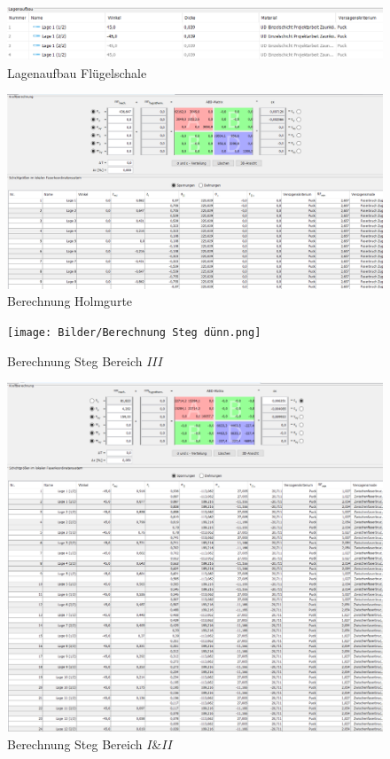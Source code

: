 \begin{figure}[h]
	\includegraphics[width=1.0\textwidth]{Bilder/Lagenaufbau Haut.png}
	\caption{Lagenaufbau Flügelschale}
	\label{fig:Lagenaufbau Haut}
\end{figure}
\begin{figure}[h]
	\includegraphics[width=1.0\textwidth]{Bilder/Berechnung Holmgurte.png}
	\caption{Berechnung Holmgurte}
	\label{fig:Berechnung Holmgurte}
\end{figure}
\begin{figure}[h]
	\texttt{[image: Bilder/Berechnung Steg dünn.png]}
	\caption{Berechnung Steg Bereich $III$}
	\label{fig:Berechnung Steg dünn}
\end{figure}
\begin{figure}[h]
	\includegraphics[width=1.0\textwidth]{Bilder/Berechnung Steg dick.png}
	\caption{Berechnung Steg Bereich $I$\&$II$}
	\label{fig:Berechnung Steg dick}
\end{figure}
